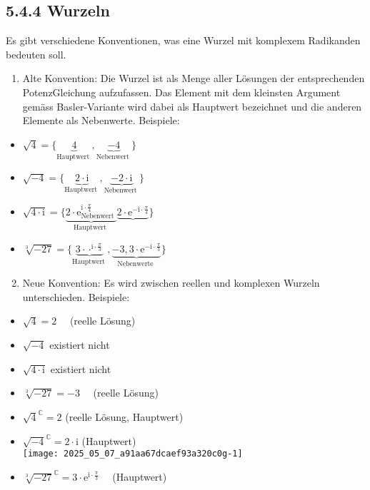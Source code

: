 \documentclass[10pt]{article}
\begin{document}
\subsection*{5.4.4 Wurzeln}
Es gibt verschiedene Konventionen, was eine Wurzel mit komplexem Radikanden bedeuten soll.

\begin{enumerate}
  \item Alte Konvention: Die Wurzel ist als Menge aller Lösungen der entsprechenden PotenzGleichung aufzufassen. Das Element mit dem kleinsten Argument gemäss Basler-Variante wird dabei als Hauptwert bezeichnet und die anderen Elemente als Nebenwerte. Beispiele:
\end{enumerate}

\begin{itemize}
  \item $\sqrt{4}=\{\underbrace{4}_{\text {Hauptwert }}, \underbrace{-4}_{\text {Nebenwert }}\}$
  \item $\sqrt{-4}=\{\underbrace{2 \cdot \mathrm{i}}_{\text {Hauptwert }}, \underbrace{-2 \cdot \mathrm{i}}_{\text {Nebenwert }}\}$
  \item $\sqrt{4 \cdot \mathrm{i}}=\{\underbrace{2 \cdot \mathrm{e}_{\text {Nebenwert }}^{\mathrm{i} \cdot \frac{\pi}{4}}}_{\text {Hauptwert }} \underbrace{2 \cdot \mathrm{e}^{-\mathrm{i} \cdot \frac{\pi}{4}}}\}$
  \item $\sqrt[3]{-27}=\{\underbrace{3 \cdot \cdot^{\mathrm{i} \cdot \frac{\pi}{3}}}_{\text {Hauptwert }}, \underbrace{-3,3 \cdot \mathrm{e}^{-\mathrm{i} \cdot \frac{\pi}{3}}}_{\text {Nebenwerte }}\}$
\end{itemize}

\begin{enumerate}
  \setcounter{enumi}{1}
  \item Neue Konvention: Es wird zwischen reellen und komplexen Wurzeln unterschieden. Beispiele:
\end{enumerate}

\begin{itemize}
  \item $\sqrt{4}=2 \quad$ (reelle Lösung)
  \item $\sqrt{-4}$ existiert nicht
  \item $\sqrt{4 \cdot \mathrm{i}}$ existiert nicht
  \item $\sqrt[3]{-27}=-3 \quad$ (reelle Lösung)
  \item $\sqrt{4}^{\mathbb{C}}=2$ (reelle Lösung, Hauptwert)
  \item $\sqrt{-4}^{\mathbb{C}}=2 \cdot \mathrm{i}$ (Hauptwert)\\
\texttt{[image: 2025\_05\_07\_a91aa67dcaef93a320c0g-1]}
  \item $\sqrt[3]{-27}^{\mathbb{C}}=3 \cdot \mathrm{e}^{\mathrm{i} \cdot \frac{\pi}{3}} \quad$ (Hauptwert)
\end{itemize}
\end{document}
